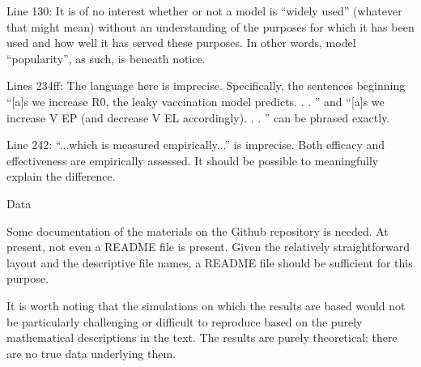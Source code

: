 \documentclass[12pt]{article}
\newcommand{\revtext}{\textsf}
\begin{document}
\revtext{Line 130: It is of no interest whether or not a model is “widely used” (whatever that might mean) without an understanding of the purposes for which it has been used and how well it has served these purposes. In other words, model “popularity”, as such, is beneath notice.}

\revtext{Lines 234ff: The language here is imprecise. Specifically, the sentences beginning “[a]s we increase R0, the leaky vaccination model predicts. . . ” and “[a]s we increase V EP (and decrease V EL accordingly). . . ” can be phrased exactly.}

\revtext{Line 242: “...which is measured empirically...” is imprecise. Both efficacy and effectiveness are empirically assessed. It should be possible to meaningfully explain the difference.}

\revtext{Data}

\revtext{Some documentation of the materials on the Github repository is needed. At present, not even a README file is present. Given the relatively straightforward layout and the descriptive file names, a README file should be sufficient for this purpose.}

\revtext{It is worth noting that the simulations on which the results are based would not be particularly challenging or difficult to reproduce based on the purely mathematical descriptions in the text. The results are purely theoretical: there are no true data underlying them.}


\end{document}
